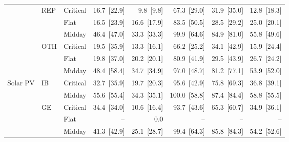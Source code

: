 \begin{tabular}{l l l r r r r r}
 & REP & Critical & 16.7~{\color{seasoncol}\scriptsize[22.9]} & 9.8~{\color{seasoncol}\scriptsize[9.8]} & 67.3~{\color{seasoncol}\scriptsize[29.0]} & 31.9~{\color{seasoncol}\scriptsize[35.0]} & 12.8~{\color{seasoncol}\scriptsize[18.3]} \\
 &  & Flat & 16.5~{\color{seasoncol}\scriptsize[23.9]} & 16.6~{\color{seasoncol}\scriptsize[17.9]} & 83.5~{\color{seasoncol}\scriptsize[50.5]} & 28.5~{\color{seasoncol}\scriptsize[29.2]} & 25.0~{\color{seasoncol}\scriptsize[20.1]} \\
 &  & Midday & 46.4~{\color{seasoncol}\scriptsize[47.0]} & 33.3~{\color{seasoncol}\scriptsize[33.3]} & 99.9~{\color{seasoncol}\scriptsize[64.6]} & 84.9~{\color{seasoncol}\scriptsize[81.0]} & 55.8~{\color{seasoncol}\scriptsize[49.6]} \\
 & OTH & Critical & 19.5~{\color{seasoncol}\scriptsize[35.9]} & 13.3~{\color{seasoncol}\scriptsize[16.1]} & 66.2~{\color{seasoncol}\scriptsize[25.2]} & 34.1~{\color{seasoncol}\scriptsize[42.9]} & 15.9~{\color{seasoncol}\scriptsize[24.4]} \\
 &  & Flat & 19.8~{\color{seasoncol}\scriptsize[37.0]} & 20.2~{\color{seasoncol}\scriptsize[20.1]} & 80.9~{\color{seasoncol}\scriptsize[41.9]} & 29.5~{\color{seasoncol}\scriptsize[43.9]} & 26.7~{\color{seasoncol}\scriptsize[24.2]} \\
 &  & Midday & 48.4~{\color{seasoncol}\scriptsize[58.4]} & 34.7~{\color{seasoncol}\scriptsize[34.9]} & 97.0~{\color{seasoncol}\scriptsize[48.7]} & 81.2~{\color{seasoncol}\scriptsize[77.1]} & 53.9~{\color{seasoncol}\scriptsize[52.0]} \\
\addlinespace
Solar PV & IB & Critical & 32.7~{\color{seasoncol}\scriptsize[35.9]} & 19.7~{\color{seasoncol}\scriptsize[20.3]} & 95.6~{\color{seasoncol}\scriptsize[42.9]} & 75.8~{\color{seasoncol}\scriptsize[69.3]} & 36.8~{\color{seasoncol}\scriptsize[39.1]} \\
 &  & Midday & 55.6~{\color{seasoncol}\scriptsize[55.4]} & 34.3~{\color{seasoncol}\scriptsize[35.1]} & 100.0~{\color{seasoncol}\scriptsize[58.8]} & 87.4~{\color{seasoncol}\scriptsize[84.4]} & 58.8~{\color{seasoncol}\scriptsize[55.5]} \\
 & GE & Critical & 34.4~{\color{seasoncol}\scriptsize[34.0]} & 10.6~{\color{seasoncol}\scriptsize[16.4]} & 93.7~{\color{seasoncol}\scriptsize[43.6]} & 65.3~{\color{seasoncol}\scriptsize[60.7]} & 34.9~{\color{seasoncol}\scriptsize[36.1]} \\
 &  & Flat & -- & 0.0 & -- & -- & -- \\
 &  & Midday & 41.3~{\color{seasoncol}\scriptsize[42.9]} & 25.1~{\color{seasoncol}\scriptsize[28.7]} & 99.4~{\color{seasoncol}\scriptsize[64.3]} & 85.8~{\color{seasoncol}\scriptsize[84.3]} & 54.2~{\color{seasoncol}\scriptsize[52.6]} \\

\end{tabular}
